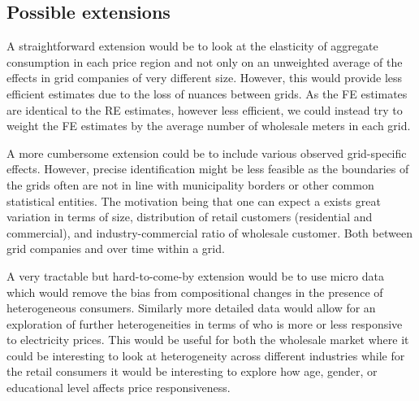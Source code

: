 \subsection{Possible extensions}
\label{subsec:r_extensions}
A straightforward extension would be to look at the elasticity of aggregate consumption in each price region and not only on an unweighted average of the effects in grid companies of very different size. However, this would provide less efficient estimates due to the loss of nuances between grids. As the FE estimates are identical to the RE estimates, however less efficient, we could instead try to weight the FE estimates by the average number of wholesale meters in each grid.
\bigskip\par
A more cumbersome extension could be to include various observed grid-specific effects. However, precise identification might be less feasible as the boundaries of the grids often are not in line with municipality borders or other common statistical entities. The motivation being that one can expect a exists great variation in terms of size, distribution of retail customers (residential and commercial), and industry-commercial ratio of wholesale customer. Both between grid companies and over time within a grid.
\bigskip\par
A very tractable but hard-to-come-by extension would be to use micro data which would remove the bias from compositional changes in the presence of heterogeneous consumers. Similarly more detailed data would allow for an exploration of further heterogeneities in terms of who is more or less responsive to electricity prices. This would be useful for both the wholesale market where it could be interesting to look at heterogeneity across different industries while for the retail consumers it would be interesting to explore how age, gender, or educational level affects price responsiveness.
